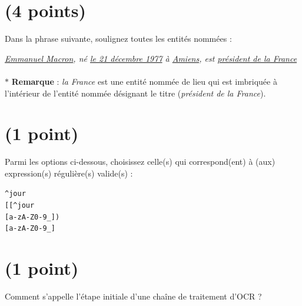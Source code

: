 \documentclass[UKenglish]{uioexam}
\begin{document}
\onehalfspacing
\section[REN]{\small(4 points)}
Dans la phrase suivante, soulignez toutes les entités nommées :

\textit{\underline{Emmanuel Macron}, né \underline{le 21 décembre 1977} à \underline{Amiens}, est \underline{président de la France}}
\\~\\
$\ast$ \textbf{Remarque} : \textit{la France} est une entité nommée de lieu qui est imbriquée à l'intérieur de l'entité nommée désignant le titre (\textit{président de la France}).

\section[Regex]{\small(1 point)}
Parmi les options ci-dessous, choisissez celle(s) qui correspond(ent) à (aux) expression(s) régulière(s) valide(s) :

\begin{choicelist}[]
   \makebox[0pt][l]{$\square$}\raisebox{0.15ex}{\hspace{0.1em}$\checkmark$} \texttt{\^{}jour}\\

    \makebox[0pt][l]{$\square$}
    \texttt{[[\^{}jour}\\

    \makebox[0pt][l]{$\square$}
    \texttt{[a-zA-Z0-9\_])}\\

   \makebox[0pt][l]{$\square$}\raisebox{0.15ex}{\hspace{0.1em}$\checkmark$} \texttt{[a-zA-Z0-9\_]}\\

\end{choicelist}
\section[OCR]{\small(1 point)}
Comment s’appelle l’étape initiale d’une chaîne de traitement d’\textsc{OCR} ?
\end{document}
